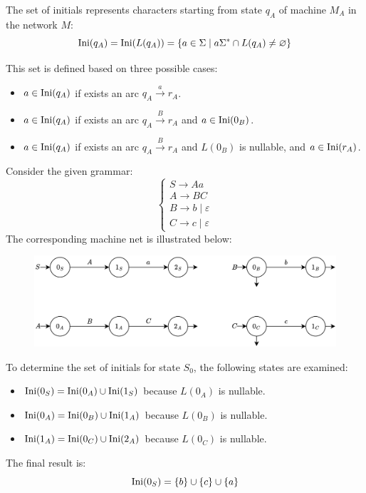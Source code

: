 \begin{definition}
    The set of initials represents characters starting from state $q_A$ of machine $M_A$ in the network $M$: 
    \[\textnormal{Ini}(q_A)=\textnormal{Ini}(L(q_A))=\{a \in \Sigma\mid a\Sigma^{\ast}\cap L(q_A) \neq \varnothing\}\]
\end{definition}
This set is defined based on three possible cases:
\begin{itemize}
    \item $a \in \textnormal{Ini}(q_A)$ if exists an arc $q_A \overset{a}{\rightarrow}r_A$. 
    \item $a \in \textnormal{Ini}(q_A)$ if exists an arc $q_A \overset{B}{\rightarrow}r_A$ and $a \in \textnormal{Ini}(0_B)$. 
    \item $a \in \textnormal{Ini}(q_A)$ if exists an arc $q_A \overset{B}{\rightarrow}r_A$ and $L(0_B)$ is nullable, and $a \in \textnormal{Ini}(r_A)$.
\end{itemize}
\begin{example}
    Consider the given grammar:
    \[\begin{cases}
        S \rightarrow Aa \\
        A \rightarrow BC \\
        B \rightarrow b\mid \varepsilon \\
        C \rightarrow c\mid \varepsilon
    \end{cases}\]
    The corresponding machine net is illustrated below:
    \begin{figure}[H]
        \centering
        \includegraphics[width=0.75\linewidth]{images/net1.png}
    \end{figure}
    To determine the set of initials for state $S_0$, the following states are examined:
    \begin{itemize}
        \item $\textnormal{Ini}(0_S)=\textnormal{Ini}(0_A) \cup \textnormal{Ini}(1_S)$ because $L(0_A)$ is nullable. 
        \item $\textnormal{Ini}(0_A)=\textnormal{Ini}(0_B) \cup \textnormal{Ini}(1_A)$ because $L(0_B)$ is nullable. 
        \item $\textnormal{Ini}(1_A)=\textnormal{Ini}(0_C) \cup \textnormal{Ini}(2_A)$ because $L(0_C)$ is nullable. 
    \end{itemize}
    The final result is: 
    \[\textnormal{Ini}(0_S)=\{b\} \cup \{c\} \cup \{a\}\]
\end{example}
